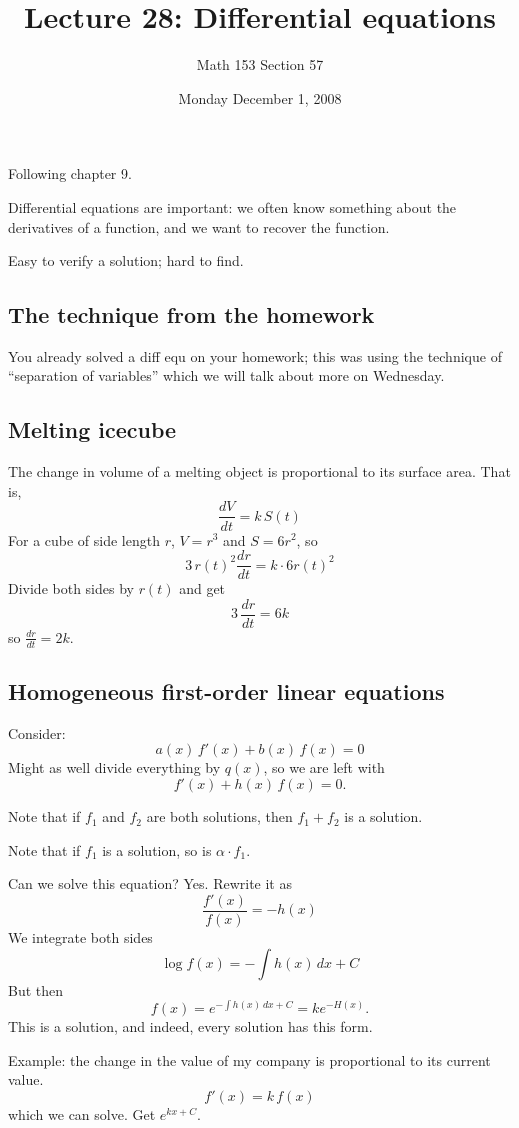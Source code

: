\documentclass[12pt]{article}
\title{Lecture 28: Differential equations}
\author{Math 153 Section 57}
\date{Monday December  1, 2008}
\begin{document}
\maketitle

Following chapter 9.

Differential equations are important: we often know something about the derivatives of a function, and we want to recover the function.

Easy to verify a solution; hard to find.

\subsection*{The technique from the homework}

You already solved a diff equ on your homework; this was using the
technique of ``separation of variables'' which we will talk about more
on Wednesday.

\subsection*{Melting icecube}

The change in volume of a melting object is proportional to its
surface area.  That is,
$$
\frac{dV}{dt} = k \, S(t)
$$
For a cube of side length $r$, $V = r^3$ and $S = 6r^2$, so
$$
3 \, r(t)^2 \frac{dr}{dt} = k \cdot 6 r(t)^2
$$
Divide both sides by $r(t)$ and get
$$
3 \, \frac{dr}{dt} = 6k
$$
so $\frac{dr}{dt} = 2k$.

\subsection*{Homogeneous first-order linear equations}

Consider:
$$
a(x) \, f'(x) + b(x) \, f(x) = 0
$$
Might as well divide everything by $q(x)$, so we are left with
$$
f'(x) + h(x) \, f(x) = 0.
$$

Note that if $f_1$ and $f_2$ are both solutions, then $f_1 + f_2$ is a solution.

Note that if $f_1$ is a solution, so is $\alpha \cdot f_1$.

Can we solve this equation?  Yes.  Rewrite it as
$$
\frac{f'(x)}{f(x)} = -h(x)
$$
We integrate both sides
$$
\log f(x) = - \int h(x) \, dx + C
$$
But then
$$
f(x) = e^{- \int h(x) \, dx + C} = k e^{-H(x)}.
$$
This is a solution, and indeed, every solution has this form.

Example: the change in the value of my company is proportional to its
current value.
$$
f'(x) = k \, f(x)
$$
which we can solve.  Get $e^{kx + C}$.
\end{document}
